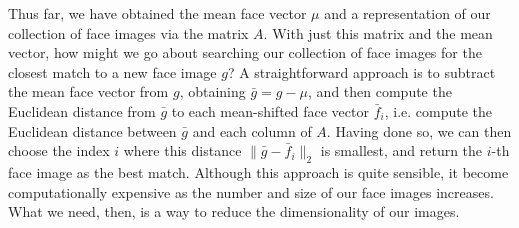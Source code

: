 Thus far, we have obtained the mean face vector $\mu$ and a representation of our collection of face images via the matrix $A$.
With just this matrix and the mean vector, how might we go about searching our collection of face images for the closest match to a new face image $g$?
A straightforward approach is to subtract the mean face vector from $g$, obtaining $\bar{g} = g-\mu$, and then compute the Euclidean distance from
$\bar{g}$ to each mean-shifted face vector $\bar{f}_i$, i.e. compute the Euclidean distance between $\bar{g}$ and each column of $A$.
Having done so, we can then choose the index $i$ where this distance $\|\bar{g}-\bar{f}_i\|_2$ is smallest, and return the $i$-th face image as the best match.
Although this approach is quite sensible, it become computationally expensive as the number and size of our face images increases.
What we need, then, is a way to reduce the dimensionality of our images.

